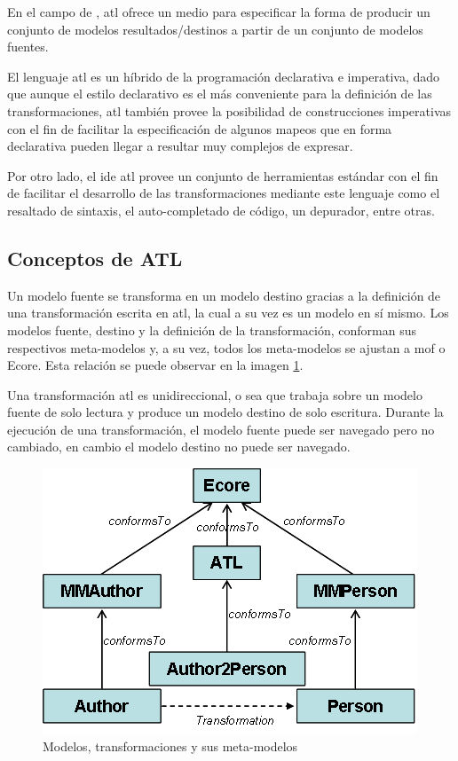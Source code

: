 \documentclass[a4paper,12pt,twoside,spanish,openright]{book}
\begin{document}
En el campo de , \gls{atl} ofrece un medio para especificar la forma de producir un conjunto de modelos resultados/destinos a partir de un conjunto de modelos fuentes.

El lenguaje \gls{atl} es un híbrido de la programación declarativa e imperativa, dado que aunque el estilo declarativo es el más conveniente para la definición de las transformaciones, \gls{atl} también provee la posibilidad de construcciones imperativas con el fin de facilitar la especificación de algunos mapeos que en forma declarativa pueden llegar a resultar muy complejos de expresar.

Por otro lado, el \gls{ide} \gls{atl} provee un conjunto de herramientas estándar con el fin de facilitar el desarrollo de las transformaciones mediante este lenguaje como el  resaltado de sintaxis, el auto-completado de código, un depurador, entre otras.



\subsection{Conceptos de ATL}

Un modelo fuente se transforma en un modelo destino gracias a la definición de una transformación escrita en \gls{atl}, la cual a su vez es un modelo en sí mismo. Los modelos fuente, destino y la definición de la transformación, conforman sus respectivos meta-modelos y, a su vez, todos los meta-modelos se ajustan a \gls{mof} o \textsf{Ecore}. Esta relación se puede observar en la imagen \ref{fig:ATL-concepts}.

Una transformación \gls{atl} es unidireccional, o sea que trabaja sobre un modelo fuente de solo lectura y produce un modelo destino de solo escritura. Durante la ejecución de una transformación, el modelo fuente puede ser navegado pero no cambiado, en cambio el modelo destino no puede ser navegado.

\begin{figure}[hbtp]
\centering
\includegraphics[scale=.65]{./img/ATL-concepts}
\caption{Modelos, transformaciones y sus meta-modelos}
\label{fig:ATL-concepts}
\end{figure}
\end{document}
